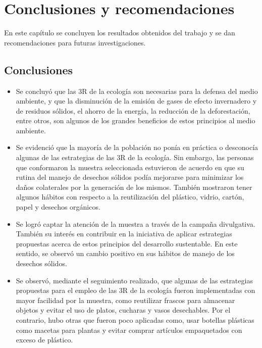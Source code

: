 \vspace*{6cm}
{\setlength{\parskip}{-0.5cm}
\chapter{Conclusiones y recomendaciones}
}
\newpage

En este capítulo se concluyen los resultados obtenidos del trabajo y se dan recomendaciones para futuras investigaciones.

{\setlength{\parskip}{0cm}
\section{Conclusiones}

\begin{itemize}
    \item Se concluyó que las 3R de la ecología son necesarias para la defensa del medio ambiente, y que la disminución de la emisión de gases de efecto invernadero y de residuos sólidos, el ahorro de la energía, la reducción de la deforestación, entre otros, son algunos de los grandes beneficios de estos principios al medio ambiente.
    
    \item Se evidenció que la mayoría de la población no ponía en práctica o desconocía algunas de las estrategias de las 3R de la ecología. Sin embargo, las personas que conformaron la muestra seleccionada estuvieron de acuerdo en que su rutina del manejo de desechos sólidos podía mejorarse para minimizar los daños colaterales por la generación de los mismos. También mostraron tener algunos hábitos con respecto a la reutilización del plástico, vidrio, cartón, papel y desechos orgánicos. 
    
    \item Se logró captar la atención de la muestra a través de la campaña divulgativa. También su interés en contribuir en la iniciativa de aplicar estrategias propuestas acerca de estos principios del desarrollo sustentable. En este sentido, se observó un cambio positivo en sus hábitos de manejo de los desechos sólidos.
    
    \item Se observó, mediante el seguimiento realizado, que algunas de las estrategias propuestas para el empleo de las 3R de la ecología fueron implementadas con mayor facilidad por la muestra, como reutilizar frascos para almacenar objetos y evitar el uso de platos, cucharas y vasos desechables. Por el contrario, hubo otras que fueron poco aplicadas como, usar botellas plásticas como macetas para plantas y evitar comprar artículos empaquetados con exceso de plástico.
\end{itemize}
}

